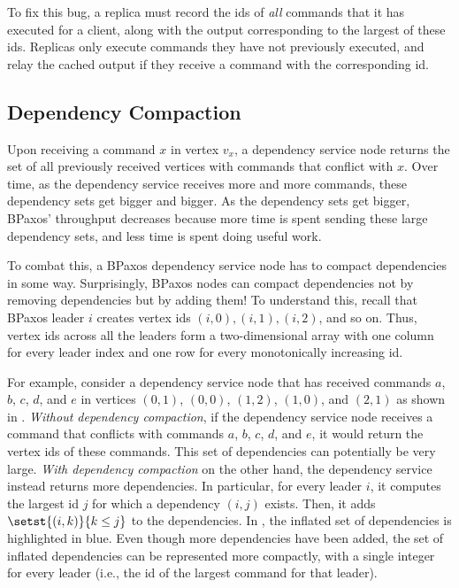To fix this bug, a replica must record the ids of \emph{all} commands that it
has executed for a client, along with the output corresponding to the largest
of these ids. Replicas only execute commands they have not previously executed,
and relay the cached output if they receive a command with the corresponding
id.


\subsection{Dependency Compaction}
Upon receiving a command $x$ in vertex $v_x$, a dependency service node returns
the set of all previously received vertices with commands that conflict with
$x$. Over time, as the dependency service receives more and more commands,
these dependency sets get bigger and bigger. As the dependency sets get bigger,
BPaxos' throughput decreases because more time is spent sending these large
dependency sets, and less time is spent doing useful work.

To combat this, a BPaxos dependency service node has to compact dependencies in
some way. Surprisingly, BPaxos nodes can compact dependencies not by removing
dependencies but by adding them! To understand this, recall that BPaxos leader
$i$ creates vertex ids $(i, 0), (i, 1), (i, 2)$, and so on. Thus, vertex ids
across all the leaders form a two-dimensional array with one column for every
leader index and one row for every monotonically increasing id.

For example, consider a dependency service node that has received commands $a$,
$b$, $c$, $d$, and $e$ in vertices $(0, 1)$, $(0, 0)$, $(1, 2)$, $(1, 0)$, and
$(2, 1)$ as shown in . \emph{Without dependency
compaction}, if the dependency service node receives a command that conflicts
with commands $a$, $b$, $c$, $d$, and $e$, it would return the vertex ids of
these commands. This set of dependencies can potentially be very large.
\emph{With dependency compaction} on the other hand, the dependency service
instead returns more dependencies. In particular, for every leader $i$, it
computes the largest id $j$ for which a dependency $(i, j)$ exists. Then, it
adds $\setst{(i, k)}{k \leq j}$ to the dependencies. In
, the inflated set of dependencies is highlighted
in blue. Even though more dependencies have been added, the set of inflated
dependencies can be represented more compactly, with a single integer for every
leader (i.e., the id of the largest command for that leader).

